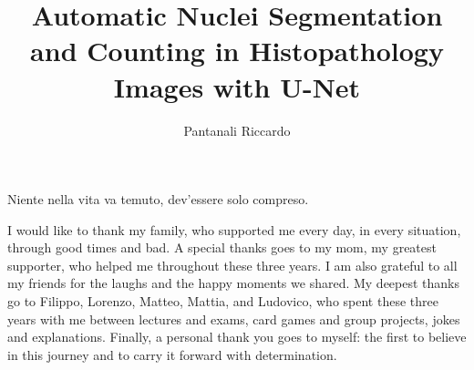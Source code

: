 \documentclass[target=bach,aauheader=,style=]{thud}
\title{Automatic Nuclei Segmentation and Counting in Histopathology Images with U-Net}
\author{Pantanali Riccardo}
\begin{document}
\maketitle

\begin{dedication}
	Niente nella vita va temuto, dev’essere solo compreso.
\end{dedication}

\acknowledgements
I would like to thank my family, who supported me every day, in every situation, through good times and bad. A special thanks goes to my mom, my greatest supporter, who helped me throughout these three years. I am also grateful to all my friends for the laughs and the happy moments we shared. My deepest thanks go to Filippo, Lorenzo, Matteo, Mattia, and Ludovico, who spent these three years with me between lectures and exams, card games and group projects, jokes and explanations. Finally, a personal thank you goes to myself: the first to believe in this journey and to carry it forward with determination.


\tableofcontents


\listoffigures

\mainmatter


\end{document}
